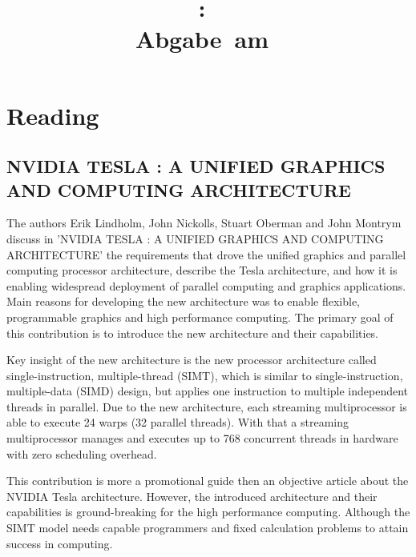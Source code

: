 \documentclass{article}
\title{
\vspace{2in}
\textmd{\textbf{\hmwkClass:\ \hmwkTitle}}\\
\normalsize\vspace{0.1in}\small{Abgabe\ am\ \hmwkDueDate}\\
\vspace{0.1in}\large{\textit{\hmwkClassTime}}
\vspace{3in}
}
\author{\textbf{\hmwkAuthorName}}
\date{} %
\newcommand{\enterProblemHeader}[1]{
}
\newcommand{\exitProblemHeader}[1]{
}
\newcounter{homeworkProblemCounter} %
\newcommand{\homeworkProblemName}{}
\newenvironment{homeworkProblem}[1][Problem \arabic{homeworkProblemCounter}]{ %
\stepcounter{homeworkProblemCounter} %
\renewcommand{\homeworkProblemName}{#1} %
\section{\homeworkProblemName} %
}{
}
\begin{document}
\maketitle


\newpage
\tableofcontents
\newpage


\begin{homeworkProblem}[Reading]
\subsection{NVIDIA TESLA : A UNIFIED GRAPHICS AND COMPUTING ARCHITECTURE}
The authors Erik Lindholm, John Nickolls, Stuart Oberman and John Montrym discuss in 
'NVIDIA TESLA : A UNIFIED GRAPHICS AND COMPUTING ARCHITECTURE' the requirements that
drove the unified graphics and parallel computing processor architecture, describe the 
Tesla architecture, and how it is enabling widespread deployment of parallel computing 
and graphics applications. Main reasons for developing the new architecture was to
enable flexible, programmable graphics and high performance computing. The primary
goal of this contribution is to introduce the new architecture and their capabilities.

Key insight of the new architecture is the new processor architecture called
single-instruction, multiple-thread (SIMT), which is similar to single-instruction,
multiple-data (SIMD) design, but applies one instruction to multiple independent 
threads in parallel. Due to the new architecture, each streaming multiprocessor 
is able to execute 24 warps (32 parallel threads). With that a streaming multiprocessor
manages and executes up to 768 concurrent threads in hardware with zero scheduling
overhead.

This contribution is more a promotional guide then an objective article about the NVIDIA 
Tesla architecture. However, the introduced architecture and their capabilities is 
ground-breaking for the high performance computing. Although the SIMT model needs
capable programmers and fixed calculation problems to attain success in computing.


\end{homeworkProblem}
\end{document}
